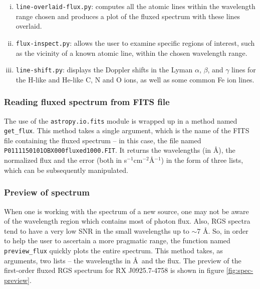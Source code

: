             \begin{enumerate}[i.]
                \item \texttt{line-overlaid-flux.py}: computes all the atomic lines within the wavelength range chosen and produces a plot of the fluxed spectrum with these lines overlaid.
                
                \item \texttt{flux-inspect.py}: allows the user to examine specific regions of interest, such as the vicinity of a known atomic line, within the chosen wavelength range.
                
                \item \texttt{line-shift.py}: displays the Doppler shifts in the Lyman $\alpha$, $\beta$, and $\gamma$ lines for the H-like and He-like C, N and O ions, as well as some common Fe ion lines.
            \end{enumerate}
        
            \subsubsection{Reading fluxed spectrum from FITS file} \label{tool:rgs-files:demonstration:read-flux}
                The use of the \texttt{astropy.io.fits} module is wrapped up in a method named \texttt{get\_flux}. This method takes a single argument, which is the name of the FITS file containing the fluxed spectrum -- in this case, the file named \texttt{P0111150101OBX000fluxed1000.FIT}. It returns the wavelengths (in \AA), the normalized flux and the error (both in s$^{-1}$cm$^{-2}$\AA$^{-1}$) in the form of three lists, which can be subsequently manipulated.
                
            \subsubsection{Preview of spectrum} \label{tool:rgs-files:demonstration:preview}
                When one is working with the spectrum of a new source, one may not be aware of the wavelength region which contains most of photon flux. Also, RGS spectra tend to have  a very low SNR in the small wavelengths up to $\sim$7 \AA. So, in order to help the user to ascertain a more pragmatic range, the function named \texttt{preview\_flux} quickly plots the entire spectrum. This method takes, as arguments, two lists -- the wavelengths in \AA~and the flux. The preview of the first-order fluxed RGS spectrum for RX J0925.7-4758 is shown in figure \ref{fig:spec-preview}.
                
